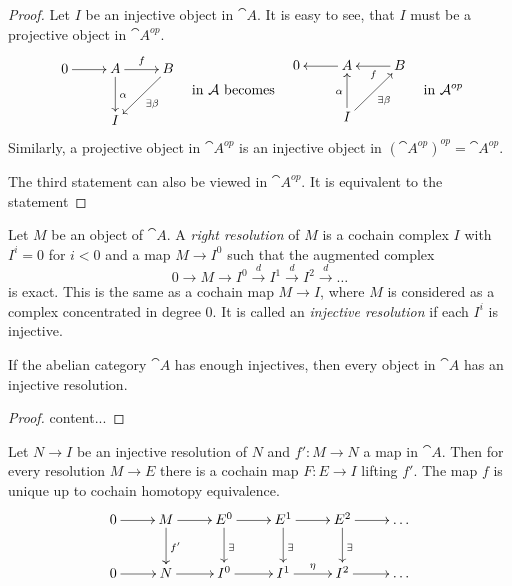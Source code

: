 \begin{proof}
	Let $I$ be an injective object in $\cat{A}$.
	It is easy to see, that $I$ must be a projective object in $\cat{A}^{op}$.
	\[
		\vcenter{\xymatrix{
			0 \ar[r] &A \ar[r]^f \ar[d]^\alpha & B \ar[ld]^{\exists\beta} \\
			&I
		}}
		\quad\text{in $\cat{A}$ becomes}\quad
		\vcenter{\xymatrix{
			0  &A \ar[l]   & B \ar[l]^f  \\
			&I \ar[u]^\alpha \ar[ru]_{\exists\beta}
		}}
	\quad\text{in $\cat{A}^{op}$}
	\]
	Similarly, a projective object in $\cat{A}^{op}$ is an injective object in $(\cat{A}^{op})^{op} = \cat{A}^{op}$.
	
	The third statement can also be viewed in $\cat{A}^{op}$.
	It is equivalent to the statement
\end{proof}

\begin{definition}
	Let $M$ be an object of $\cat{A}$.
	A \textit{right resolution} of $M$ is a cochain complex $I$ with $I^i=0$ for $i<0$ and a map $M\rightarrow I^0$ such that the augmented complex
	$$0 \rightarrow M \rightarrow I^0 \overset{d}{\rightarrow} I^1 \overset{d}{\rightarrow} I^2 \overset{d}{\rightarrow} \dots$$
	is exact.
	This is the same as a cochain map $M\rightarrow I$, where $M$ is considered as a complex concentrated in degree $0$.
	It is called an \textit{injective resolution} if each $I^i$ is injective.
\end{definition}

\begin{lemma}
	If the abelian category $\cat{A}$ has enough injectives, then every object in $\cat{A}$ has an injective resolution.
\end{lemma}

\begin{proof}
	content...
\end{proof}

\begin{theorem}
	Let $N\rightarrow I$ be an injective resolution of $N$ and $f':M\rightarrow N$ a map in $\cat{A}$. Then for every resolution $M\rightarrow E$ there is a cochain map $F:E\rightarrow I$ lifting $f'$.
	The map $f$ is unique up to cochain homotopy equivalence.
	\begin{align*}
		\xymatrix{
			0 \ar[r] &M \ar[r] \ar[d]^{f'} &E^0 \ar[r] \ar[d]^{\exists} &E^1 \ar[r] \ar[d]^{\exists} &E^2 \ar[r] \ar[d]^{\exists} &\dots \\
			0 \ar[r] &N \ar[r] &I^0 \ar[r] &I^1 \ar[r]^{\eta} &I^2 \ar[r] &\dots
		}
	\end{align*}
\end{theorem}

